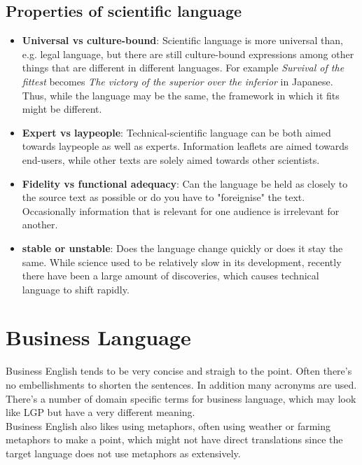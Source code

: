 \documentclass{article}
\begin{document}
	\subsection{Properties of scientific language}
	\begin{itemize}
		\item{\textbf{Universal vs culture-bound}: Scientific language is more universal than, e.g. legal language, but there are still culture-bound expressions among other things that are different in different languages. For example \textit{Survival of the fittest} becomes \textit{The victory of the superior over the inferior} in Japanese. Thus, while the language may be the same, the framework in which it fits might be different.}
		\item{\textbf{Expert vs laypeople}: Technical-scientific language can be both aimed towards laypeople as well as experts. Information leaflets are aimed towards end-users, while other texts are solely aimed towards other scientists.}
		\item{\textbf{Fidelity vs functional adequacy}: Can the language be held as closely to the source text as possible or do you have to "foreignise" the text. Occasionally information that is relevant for one audience is irrelevant for another.}
		\item{\textbf{stable or unstable}: Does the language change quickly or does it stay the same. While science used to be relatively slow in its development, recently there have been a large amount of discoveries, which causes technical language to shift rapidly.}
	\end{itemize}

	\section{Business Language}
	Business English tends to be very concise and straigh to the point. Often there's no embellishments to shorten the sentences. In addition many acronyms are used. There's a number of domain specific terms for business language, which may look like LGP but have a very different meaning. \\
	Business English also likes using metaphors, often using weather or farming metaphors to make a point, which might not have direct translations since the target language does not use metaphors as extensively.
	

	

	

















	
\end{document}
